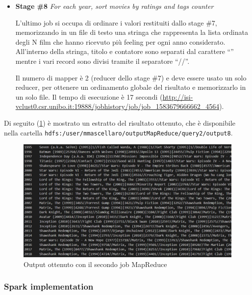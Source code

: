 \documentclass[10pt]{article}
\begin{document}
\begin{itemize}
Il job usa 3 mapper (2 per il risultato dello stage precedente e 1 per la lettura del file \textit{Movies}) e il numero di reducer scelto è uguale a 2. Il tempo di esecuzione è 23 secondi (\url{http://isi-vclust0.csr.unibo.it:19888/jobhistory/job/job_1583679666662_4563}).

\newpage

\item \textbf{Stage \#8} \textit{For each year, sort movies by ratings and tags counter}

L'ultimo job si occupa di ordinare i valori restituiti dallo stage \#7, memorizzando in un file di testo una stringa che rappresenta la lista ordinata degli N film che hanno ricevuto più feeling per ogni anno considerato. All'interno della stringa, titolo e contatore sono separati dal carattere ``\textbar'' mentre i vari record sono divisi tramite il separatore ``//''.

Il numero di mapper è 2 (reducer dello stage \#7) e deve essere usato un solo reducer, per ottenere un ordinamento globale del risultato e memorizzarlo in un solo file. Il tempo di esecuzione è 17 secondi (\url{http://isi-vclust0.csr.unibo.it:19888/jobhistory/job/job_1583679666662_4564}).
\end{itemize}

Di seguito (\ref{Result2}) è mostrato un estratto del risultato ottenuto, che è disponibile nella cartella \texttt{hdfs:/user/mmascellaro/outputMapReduce/query2/output8}.

\begin{figure}[th]
	\centering
	\includegraphics[scale=0.65]{images/Result2.jpg}
	\caption{Output ottenuto con il secondo job MapReduce}
	\label{Result2}
\end{figure}

\subsubsection{Spark implementation}
\end{document}
